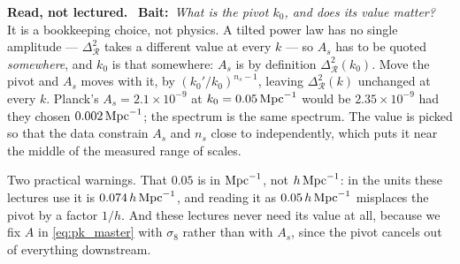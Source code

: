 \documentclass[a4paper,11pt]{article}
\numberwithin{equation}{section}
\newenvironment{reading}
  {\par\medskip\noindent\begingroup\small\color{black!58}%
   \textbf{Read, not lectured.}\ }
  {\endgroup\par\medskip}
\newcommand{\bait}[1]{\textbf{Bait:}\ \emph{#1}\ }
\begin{document}
\begin{reading}
\bait{What is the pivot $k_0$, and does its value matter?}
It is a bookkeeping choice, not physics. A tilted power law has no single amplitude ---
$\Delta^2_{\mathcal{R}}$ takes a different value at every $k$ --- so $A_s$ has to
be quoted \emph{somewhere}, and $k_0$ is that somewhere: $A_s$ is by definition
$\Delta^2_{\mathcal{R}}(k_0)$. Move the pivot and $A_s$ moves with it, by
$(k_0'/k_0)^{n_s-1}$, leaving $\Delta^2_{\mathcal{R}}(k)$ unchanged at every $k$.
Planck's $A_s = 2.1\times10^{-9}$ at $k_0 = 0.05\,{\rm Mpc}^{-1}$ would be
$2.35\times10^{-9}$ had they chosen $0.002\,{\rm Mpc}^{-1}$; the spectrum is the
same spectrum. The value is picked so that the data constrain $A_s$ and $n_s$
close to independently, which puts it near the middle of the measured range of
scales.

Two practical warnings. That $0.05$ is in ${\rm Mpc}^{-1}$, not
$h\,{\rm Mpc}^{-1}$: in the units these lectures use it is
$0.074\,h\,{\rm Mpc}^{-1}$, and reading it as $0.05\,h\,{\rm Mpc}^{-1}$ misplaces
the pivot by a factor $1/h$. And these lectures never need its value at all,
because we fix $A$ in \eqref{eq:pk_master} with $\sigma_8$ rather than with $A_s$, since the pivot cancels out of everything downstream.
\end{reading}
\end{document}
